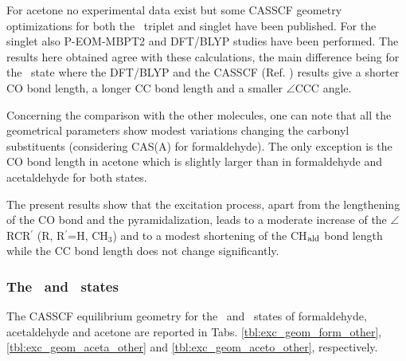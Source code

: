 

For acetone no experimental data exist but some CASSCF geometry
optimizations for both the \npi\ triplet and singlet have been published.
For the singlet also P-EOM-MBPT2 \cite{jcp-110-62-1999} and DFT/BLYP
\cite{jcp-108-4060-1998} studies have been performed. The results here
obtained agree with these calculations, the main difference being for the
\snpi\ state where the DFT/BLYP \cite{jcp-108-4060-1998} and the CASSCF
(Ref. ) results give a shorter CO bond length, a
longer CC bond length and a smaller $\angle$CCC angle. 

Concerning the comparison with the other molecules, one can note that all
the geometrical parameters show modest variations changing the carbonyl
substituents (considering CAS(A) for formaldehyde). The only exception is
the CO bond length in acetone which is slightly larger than in formaldehyde
and acetaldehyde for both states.

The present results show that the excitation process, apart from the
lengthening of the CO bond and the pyramidalization, leads to a
moderate increase of the $\angle$RCR$^\prime$ (R, R$^\prime$=H, CH$_3$) and
to a modest shortening of the CH$_{\rm ald}$ bond length while the CC bond
length does not change significantly. 

\subsubsection*{The \pipi\ and \spi\ states}

The CASSCF equilibrium geometry for the \pipi\ and \spi\ states of formaldehyde, acetaldehyde and acetone
are reported in Tabs. \ref{tbl:exc_geom_form_other},
\ref{tbl:exc_geom_aceta_other} and \ref{tbl:exc_geom_aceto_other},
respectively.



